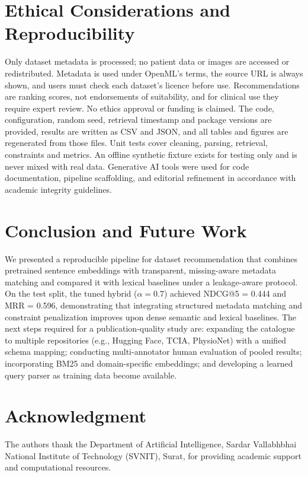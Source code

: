 \documentclass[conference]{IEEEtran}
\begin{document}
\section{Ethical Considerations and Reproducibility}
Only dataset metadata is processed; no patient data or images are accessed or redistributed. Metadata is used under OpenML's terms, the source URL is always shown, and users must check each dataset's licence before use. Recommendations are ranking scores, not endorsements of suitability, and for clinical use they require expert review. No ethics approval or funding is claimed. The code, configuration, random seed, retrieval timestamp and package versions are provided, results are written as CSV and JSON, and all tables and figures are regenerated from those files. Unit tests cover cleaning, parsing, retrieval, constraints and metrics. An offline synthetic fixture exists for testing only and is never mixed with real data. Generative AI tools were used for code documentation, pipeline scaffolding, and editorial refinement in accordance with academic integrity guidelines.

\section{Conclusion and Future Work}
We presented a reproducible pipeline for dataset recommendation that combines pretrained sentence embeddings with transparent, missing-aware metadata matching and compared it with lexical baselines under a leakage-aware protocol. On the test split, the tuned hybrid ($\alpha=0.7$) achieved NDCG@5 = 0.444 and MRR = 0.596, demonstrating that integrating structured metadata matching and constraint penalization improves upon dense semantic and lexical baselines. The next steps required for a publication-quality study are: expanding the catalogue to multiple repositories (e.g., Hugging Face, TCIA, PhysioNet) with a unified schema mapping; conducting multi-annotator human evaluation of pooled results; incorporating BM25 and domain-specific embeddings; and developing a learned query parser as training data become available.

\section*{Acknowledgment}
The authors thank the Department of Artificial Intelligence, Sardar Vallabhbhai National Institute of Technology (SVNIT), Surat, for providing academic support and computational resources.
\end{document}
